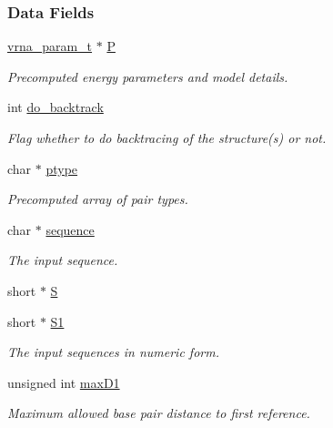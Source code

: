 \subsubsection*{Data Fields}
\begin{DoxyCompactItemize}
\item 
\mbox{\hyperlink{group__energy__parameters_ga8a69ca7d787e4fd6079914f5343a1f35}{vrna\+\_\+param\+\_\+t}} $\ast$ \mbox{\hyperlink{group__kl__neighborhood__mfe_a70da9e83ad87c37013b4bf0b265dd307}{P}}
\begin{DoxyCompactList}\small\item\em Precomputed energy parameters and model details. \end{DoxyCompactList}\item 
int \mbox{\hyperlink{group__kl__neighborhood__mfe_ade5c7e9337a458ae20bac75abdc52d64}{do\+\_\+backtrack}}
\begin{DoxyCompactList}\small\item\em Flag whether to do backtracing of the structure(s) or not. \end{DoxyCompactList}\item 
char $\ast$ \mbox{\hyperlink{group__kl__neighborhood__mfe_aedf60b8b26dae05ad266d3e098d18208}{ptype}}
\begin{DoxyCompactList}\small\item\em Precomputed array of pair types. \end{DoxyCompactList}\item 
char $\ast$ \mbox{\hyperlink{group__kl__neighborhood__mfe_a3596f3d4d320318c4b8428e2abc7ab56}{sequence}}
\begin{DoxyCompactList}\small\item\em The input sequence. \end{DoxyCompactList}\item 
short $\ast$ \mbox{\hyperlink{group__kl__neighborhood__mfe_adcf49c88c890de55d2215532bf22006c}{S}}
\item 
short $\ast$ \mbox{\hyperlink{group__kl__neighborhood__mfe_ab9ee459ffbfb5d2c138a033516056cdc}{S1}}
\begin{DoxyCompactList}\small\item\em The input sequences in numeric form. \end{DoxyCompactList}\item 
unsigned int \mbox{\hyperlink{group__kl__neighborhood__mfe_a621ed2ab02116f3f8f5e7120dec429eb}{max\+D1}}
\begin{DoxyCompactList}\small\item\em Maximum allowed base pair distance to first reference. \end{DoxyCompactList}\item 

\end{DoxyCompactItemize}
